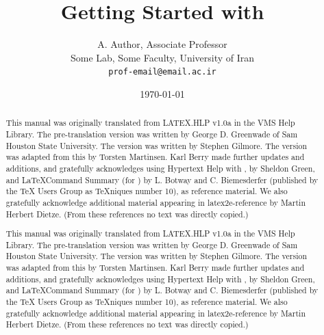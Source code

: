 \documentclass{article}
\begin{document}
	\title{Getting Started with \LaTeXe}
	
	\author{A. Author, Associate Professor\\ Some Lab, Some Faculty, University of Iran\\ \texttt{prof-email@email.ac.ir}}
	
	\date{\today}
	
	\maketitle
	
	\pagebreak
	
	\begin{abstract}
		This manual was originally translated from LATEX.HLP v1.0a in the VMS Help Library.  The pre-translation version was written by George D. Greenwade of Sam Houston State University.  The  version was written by Stephen Gilmore.  The \LaTeXe version was adapted from this by Torsten Martinsen.  Karl Berry made further updates and additions, and gratefully acknowledges using Hypertext Help with \LaTeXe, by Sheldon Green, and \LaTeX Command Summary (for ) by L. Botway and C. Biemesderfer (published by the TeX Users Group as TeXniques number 10), as reference material.  We also gratefully acknowledge additional material appearing in latex2e-reference by Martin Herbert Dietze.  (From these references no text was directly copied.)
		
		This manual was originally translated from LATEX.HLP v1.0a in the VMS Help Library.  The pre-translation version was written by George D. Greenwade of Sam Houston State University.  The  version was written by Stephen Gilmore.  The \LaTeXe version was adapted from this by Torsten Martinsen.  Karl Berry made further updates and additions, and gratefully acknowledges using Hypertext Help with \LaTeXe, by Sheldon Green, and \LaTeX Command Summary (for ) by L. Botway and C. Biemesderfer (published by the TeX Users Group as TeXniques number 10), as reference material.  We also gratefully acknowledge additional material appearing in latex2e-reference by Martin Herbert Dietze.  (From these references no text was directly copied.)
	\end{abstract}
	
	\pagebreak
	
\end{document}

